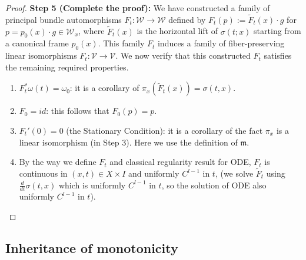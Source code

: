 \documentclass[11pt]{amsart}
\theoremstyle{remark}
\theoremstyle{definition}
\begin{document}
\begin{proof}
\textbf{ Step 5 (Complete the proof):}
We have constructed a family of principal bundle automorphisms $F_t: \mathcal{W} \to \mathcal{W}$ defined by $F_t(p) := \tilde{F}_t(x) \cdot g$ for $p = p_0(x) \cdot g \in \mathcal{W}_x$, where $\tilde{F}_t(x)$ is the horizontal lift of $\sigma(t;x)$ starting from a canonical frame $p_0(x)$. This family $F_t$ induces a family of fiber-preserving linear isomorphisms $F_t: \mathcal{V} \to \mathcal{V}$. We now verify that this constructed $F_t$ satisfies the remaining required properties.
\begin{enumerate}
\item $F_t^* \omega(t) = \omega_0$: it is a corollary of $\pi_x(\tilde F_t(x))=\sigma(t,x)$.
\item $F_0 = id$: this follows that $ F_0(p)=p$.
\item $F_t'(0) = 0$ (the Stationary Condition): it is a corollary of the fact $\pi_x$ is a linear isomorphism (in Step 3). Here we use the definition of $\mathfrak m$.
\item By the way we define $F_t$ and classical regularity result for ODE, $F_t$  is continuous in $(x,t)\in X\times I$ and uniformly $C^{l-1}$ in $t$, (we solve $\tilde F_t$ using $\frac{d}{dt}\sigma(t,x)$ which is uniformly $C^{l-1}$ in $t$, so the solution of ODE also uniformly $C^{l-1}$ in $t$). 
\end{enumerate}
	\end{proof}







\subsection{Inheritance of monotonicity}
\end{document}
